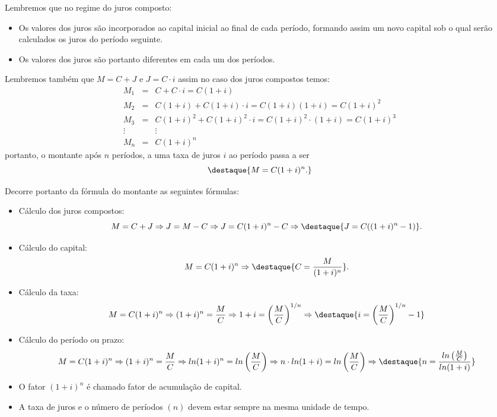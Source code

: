  Lembremos que no regime do juros composto:
 \begin{itemize}
  \item Os valores dos juros são incorporados ao capital inicial ao final de cada período, formando assim um novo capital sob o qual serão calculados os juros do período seguinte.
  \item Os valores dos juros são portanto diferentes em cada um dos períodos.
 \end{itemize}
 Lembremos também que $M= C+J$ e $J= C \cdot i$ assim no caso dos juros compostos temos:
 \begin{eqnarray*}
  M_1&=& C + C \cdot i = C(1+i) \\
  M_2&=& C(1+i) + C(1+i)\cdot i = C(1+i)(1+i)= C(1+i)^2\\
  M_3&=& C(1+i)^2 + C(1+i)^2\cdot i= C(1+i)^2 \cdot (1+i) = C(1+i)^3 \\
  \vdots & & \vdots\\
  M_n&=& C(1+i)^n
 \end{eqnarray*}
 portanto, o montante após $n$ períodos, a uma taxa de juros $i$ ao período passa a ser 
 \[\destaque{M= C(1+i)^n.}\]

 Decorre portanto da fórmula do montante as seguintes fórmulas:
 \begin{itemize}
  \item Cálculo dos juros compostos:
  \[M=C+J \Rightarrow J= M-C \Rightarrow J= C(1+i)^n - C \Rightarrow \destaque{J= C((1+i)^n - 1)}.\]
  \item Cálculo do capital:
  \[M= C(1+i)^n \Rightarrow \destaque{C= \frac{M}{(1+i)^n}}.\]
  \item Cálculo da taxa:
  \[M= C(1+i)^n \Rightarrow (1+i)^n= \frac{M}{C} \Rightarrow 1+i= \left(\frac{M}{C}\right)^{1/n} \Rightarrow \destaque{i= \left(\frac{M}{C}\right)^{1/n} -1}\]
  \item Cálculo do período ou prazo:
  \[M= C(1+i)^n \Rightarrow (1+i)^n= \frac{M}{C} \Rightarrow ln(1+i)^n= ln\left(\frac{M}{C}\right) \Rightarrow n \cdot ln(1+i)= ln\left(\frac{M}{C}\right) \Rightarrow \destaque{n= \frac{ln\left(\frac{M}{C}\right)}{ln(1+i)}}\]
 \end{itemize}
 
 \begin{obs}
 \begin{itemize}
  \item O fator $(1+i)^n$ é chamado fator de acumulação de capital.
  \item A taxa de juros e o número de períodos $(n)$ devem estar sempre na mesma unidade de tempo.
 \end{itemize} 
 \end{obs}
 
 \newpage
 
 

